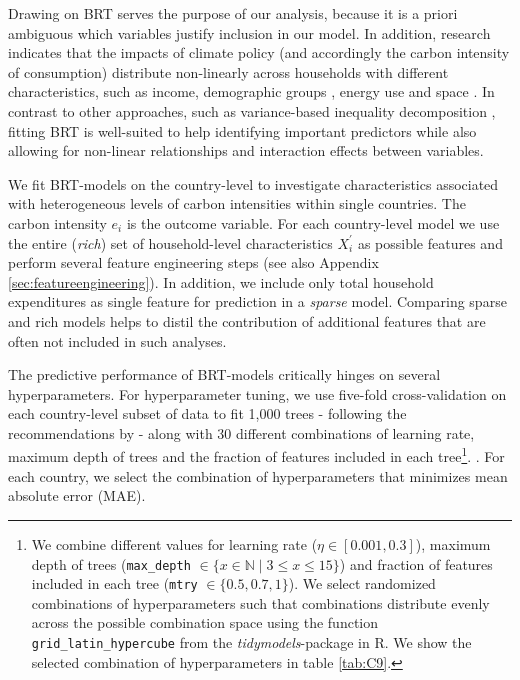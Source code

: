 \documentclass[12pt, a4paper]{article}
\begin{document}
Drawing on BRT serves the purpose of our analysis, because it is a priori ambiguous which variables justify inclusion in our model. In addition, research indicates that the impacts of climate policy (and accordingly the carbon intensity of consumption) distribute non-linearly across households with different characteristics, such as income, demographic groups \autocite{Missbach.2023}, energy use \autocite{Farrell.2017} and space \autocite{Chan.2023}. In contrast to other approaches, such as variance-based inequality decomposition \autocite{Farrell.2017,Sager.2019,Missbach.2024}, fitting BRT is well-suited to help identifying important predictors while also allowing for non-linear relationships and interaction effects between variables.

We fit BRT-models on the country-level to investigate characteristics associated with heterogeneous levels of carbon intensities within single countries. The carbon intensity $e_{i}$ is the outcome variable. For each country-level model we use the entire (\textit{rich}) set of household-level characteristics $X_{i}^{'}$ as possible features and perform several feature engineering steps (see also Appendix \ref{sec:featureengineering}). In addition, we include only total household expenditures as single feature for prediction in a \textit{sparse} model. Comparing sparse and rich models helps to distil the contribution of additional features that are often not included in such analyses.



The predictive performance of BRT-models critically hinges on several hyperparameters. For hyperparameter tuning, we use five-fold cross-validation on each country-level subset of data to fit 1,000 trees - following the recommendations by \textcite{Elith.2008} - along with 30 different combinations of learning rate, maximum depth of trees and the fraction of features included in each tree\footnote{We combine different values for learning rate ($\eta \in [0.001,0.3]$), maximum depth of trees (\texttt{max\_depth} $\in \{x \in \mathbb{N} \mid 3  \leq x \leq 15 \}$) and fraction of features included in each tree (\texttt{mtry} $\in \{0.5,0.7,1\}$). We select randomized combinations of hyperparameters such that combinations distribute evenly across the possible combination space using the function \texttt{grid\_latin\_hypercube} from the \textit{tidymodels}-package in R. We show the selected combination of hyperparameters in table \ref{tab:C9}.}. . For each country, we select the combination of hyperparameters that minimizes mean absolute error (MAE).
\end{document}
